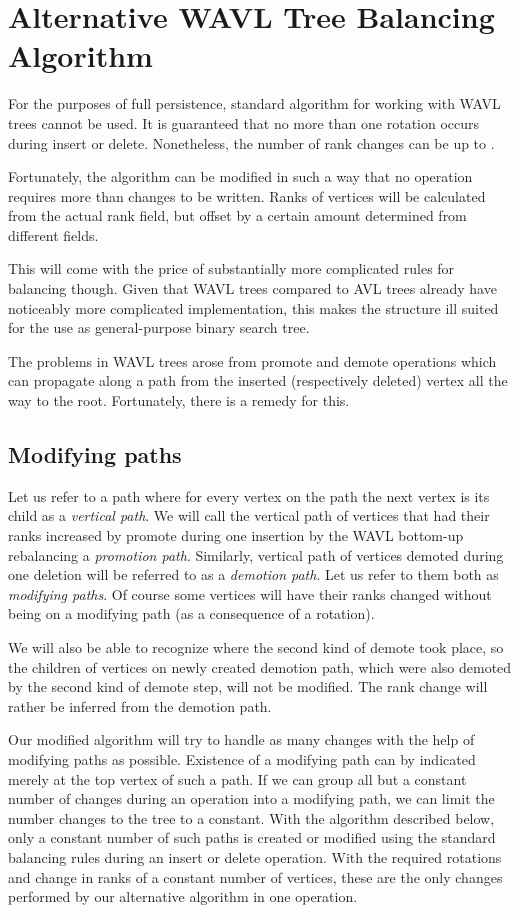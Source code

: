 \chapter{Alternative WAVL Tree Balancing Algorithm}

For the purposes of full persistence, standard algorithm for working with WAVL trees cannot be used. It is guaranteed that no more than one rotation occurs during insert or delete. Nonetheless, the number of rank changes can be up to . 

Fortunately, the algorithm can be modified in such a way that no operation requires more than  changes to be written. Ranks of vertices will be calculated from the actual rank field, but offset by a certain amount determined from different fields. 

This will come with the price of substantially more complicated rules for balancing though. Given that WAVL trees compared to AVL trees already have noticeably more complicated implementation, this makes the structure ill suited for the use as general-purpose binary search tree. 

The problems in WAVL trees arose from promote and demote operations which can propagate along a path from the inserted (respectively deleted) vertex all the way to the root. Fortunately, there is a remedy for this. 

\section{Modifying paths}

Let us refer to a path where for every vertex on the path the next vertex is its child as a {\em vertical path}.
We will call the vertical path of vertices that had their ranks increased by promote during one insertion by the WAVL bottom-up rebalancing a {\em promotion path}. 
Similarly, vertical path of vertices demoted during one deletion will be referred to as a {\em demotion path}.
Let us refer to them both as {\em modifying paths}.
Of course some vertices will have their ranks changed without being on a modifying path (as a consequence of a rotation).

We will also be able to recognize where the second kind of demote took place, so the children of vertices on newly created demotion path, which were also demoted by the second kind of demote step, will not be modified. The rank change will rather be inferred from the demotion path. 

Our modified algorithm will try to handle as many changes with the help of modifying paths as possible. Existence of a modifying path can by indicated merely at the top vertex of such a path. If we can group all but a constant number of changes during an operation into a modifying path, we can limit the number changes to the tree to a constant. With the algorithm described below, only a constant number of such paths is created or modified using the standard balancing rules during an insert or delete operation. With the required rotations and change in ranks of a constant number of vertices, these are the only changes performed by our alternative algorithm in one operation.

